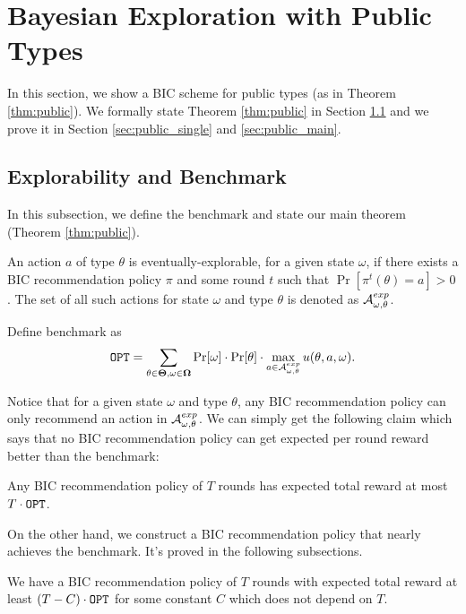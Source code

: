 
\section{Bayesian Exploration with Public Types}
\label{sec:public}
In this section, we show a BIC scheme for public types (as in Theorem \ref{thm:public}). We formally state Theorem \ref{thm:public} in Section \ref{sec:public_bench} and we prove it in Section \ref{sec:public_single} and \ref{sec:public_main}.

\subsection{Explorability and Benchmark}
\label{sec:public_bench}
In this subsection, we define the benchmark and state our main theorem (Theorem \ref{thm:public}).

\begin{definition}
\label{def:public_exp}
An action $a$ of type $\theta$ is eventually-explorable, for a given state $\omega$, if there exists a BIC recommendation policy $\pi$ and some round $t$ such that $\Pr[\pi^t(\theta)= a]> 0$. The set of all such actions for state $\omega$ and type $\theta$ is denoted as $\mathcal{A}_{\omega,\theta}^{exp}$.
\end{definition}

\begin{definition}[Benchmark]
Define benchmark as
\[
\mathtt{OPT} = \sum_{\theta \in \bold{\Theta}, \omega\in \bold{\Omega}} \Pr[\omega] \cdot \Pr[\theta] \cdot \max_{a \in \mathcal{A}_{\omega,\theta}^{exp}} u(\theta, a, \omega).
\]
\end{definition}

Notice that for a given state $\omega$ and type $\theta$, any BIC recommendation policy can only recommend an action in $\mathcal{A}_{\omega,\theta}^{exp}$. We can simply get the following claim which says that no BIC recommendation policy can get expected per round reward better than the benchmark:
\begin{claim}
Any BIC recommendation policy of $T$ rounds has expected total reward at most $T \cdot\mathtt{OPT}$.
\end{claim}

On the other hand, we construct a BIC recommendation policy that nearly achieves the benchmark. It's proved in the following subsections.
\begin{theorem}
\label{thm:public}
We have a BIC recommendation policy of $T$ rounds with expected total reward at least $\left(T - C \right) \cdot \mathtt{OPT}$ for some constant $C$ which does not depend on $T$.
\end{theorem}

